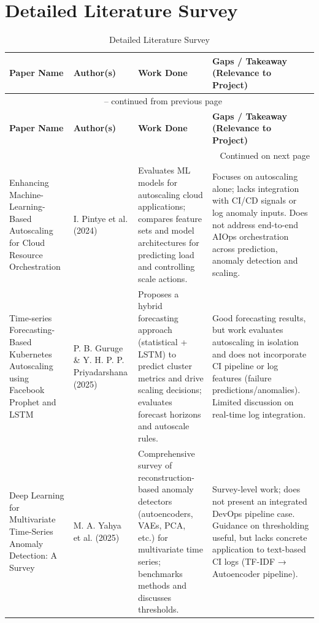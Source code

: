 \documentclass[12pt]{report}
\begin{document}
\section{Detailed Literature Survey}

\begin{longtable}{|p{4.2cm}|p{3.2cm}|p{4.3cm}|p{3.8cm}|}
\caption{Detailed Literature Survey}
\label{table:lit_survey} \\
\hline
\textbf{Paper Name} & \textbf{Author(s)} & \textbf{Work Done} & \textbf{Gaps / Takeaway (Relevance to Project)} \\
\hline
\endfirsthead

\multicolumn{4}{c}{{\tablename\ \thetable{} -- continued from previous page}} \\
\hline
\textbf{Paper Name} & \textbf{Author(s)} & \textbf{Work Done} & \textbf{Gaps / Takeaway (Relevance to Project)} \\
\hline
\endhead

\hline \multicolumn{4}{r}{{Continued on next page}} \\
\endfoot

\hline
\endlastfoot


Enhancing Machine-Learning-Based Autoscaling for Cloud Resource Orchestration &
I. Pintye et al. (2024) &
Evaluates ML models for autoscaling cloud applications; compares feature sets and model architectures for predicting load and controlling scale actions. &
Focuses on autoscaling alone; lacks integration with CI/CD signals or log anomaly inputs. Does not address end-to-end AIOps orchestration across prediction, anomaly detection and scaling. \\
\hline

Time-series Forecasting-Based Kubernetes Autoscaling using Facebook Prophet and LSTM &
P. B. Guruge \& Y. H. P. P. Priyadarshana (2025) &
Proposes a hybrid forecasting approach (statistical + LSTM) to predict cluster metrics and drive scaling decisions; evaluates forecast horizons and autoscale rules. &
Good forecasting results, but work evaluates autoscaling in isolation and does not incorporate CI pipeline or log features (failure predictions/anomalies). Limited discussion on real-time log integration. \\
\hline

Deep Learning for Multivariate Time-Series Anomaly Detection: A Survey &
M. A. Yahya et al. (2025) &
Comprehensive survey of reconstruction-based anomaly detectors (autoencoders, VAEs, PCA, etc.) for multivariate time series; benchmarks methods and discusses thresholds. &
Survey-level work; does not present an integrated DevOps pipeline case. Guidance on thresholding useful, but lacks concrete application to text-based CI logs (TF-IDF → Autoencoder pipeline). \\
\hline


\end{longtable}
\end{document}
